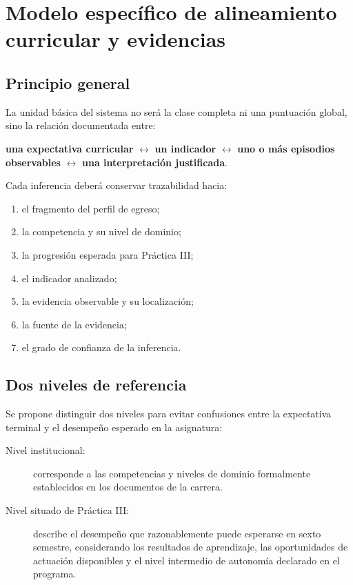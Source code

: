 \documentclass[11pt,a4paper]{article}
\begin{document}
\section{Modelo específico de alineamiento curricular y evidencias}

\subsection{Principio general}

La unidad básica del sistema no será la clase completa ni una puntuación global, sino la relación documentada entre:

\begin{center}
\textbf{una expectativa curricular}
$\leftrightarrow$
\textbf{un indicador}
$\leftrightarrow$
\textbf{uno o más episodios observables}
$\leftrightarrow$
\textbf{una interpretación justificada}.
\end{center}

Cada inferencia deberá conservar trazabilidad hacia:

\begin{enumerate}
    \item el fragmento del perfil de egreso;
    \item la competencia y su nivel de dominio;
    \item la progresión esperada para Práctica III;
    \item el indicador analizado;
    \item la evidencia observable y su localización;
    \item la fuente de la evidencia;
    \item el grado de confianza de la inferencia.
\end{enumerate}

\subsection{Dos niveles de referencia}

Se propone distinguir dos niveles para evitar confusiones entre la expectativa terminal y el desempeño esperado en la asignatura:

\begin{description}
    \item[Nivel institucional:] corresponde a las competencias y niveles de dominio formalmente establecidos en los documentos de la carrera.
    \item[Nivel situado de Práctica III:] describe el desempeño que razonablemente puede esperarse en sexto semestre, considerando los resultados de aprendizaje, las oportunidades de actuación disponibles y el nivel intermedio de autonomía declarado en el programa.
\end{description}
\end{document}
